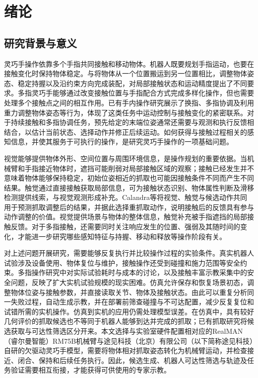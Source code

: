 \chapter{绪论}
\label{chap:ch01_introduction}

\section{研究背景与意义}
\label{sec:research_background}

灵巧手操作依靠多个手指共同接触和移动物体。机器人既要规划手指运动，也要在接触变化时保持物体稳定。与将物体从一个位置搬运到另一位置相比，调整物体姿态、稳定持握以及沿约束方向完成装配，对局部接触状态和运动精度提出了不同要求。多指灵巧手能够通过改变接触位置与手指配合方式完成多样化操作，但也需要处理多个接触点之间的相互作用。已有手内操作研究展示了换指、多指协调及利用重力调整物体姿态等行为，体现了这类任务中运动控制与接触变化的紧密联系\cite{openai2020dexterous}。对于持续接触和多指协调任务，预先给定的末端位姿通常还需要与观测和执行反馈相结合，以估计当前状态、选择动作并修正后续运动。如何获得与接触过程相关的感知信息，并使其服务于可执行的操作，是研究灵巧手操作的一项基础问题。

视觉能够提供物体外形、空间位置与周围环境信息，是操作规划的重要依据。当机械臂和手指接近物体时，遮挡可能削弱对局部接触区域的观察；接触已经发生并不意味着物体能够保持稳定，初始位姿相近的抓取也可能因接触条件不同而产生不同结果。触觉通过直接接触获取局部信息，可为接触状态识别、物体属性判断及滑移检测提供线索，与视觉观测形成补充\cite{luo2017tactile}。Calandra等将视觉、触觉与候选动作共同用于预测抓取调整后的结果，并据此选择重抓取动作，说明接触后的反馈具有参与动作调整的价值\cite{calandra2018feeling}。视觉提供场景与物体的整体信息，触觉补充被手指遮挡的局部接触反馈。对于多指接触，还需要同时关注响应发生的位置、强弱及其随时间的变化，才能进一步研究哪些感知特征与持握、移动和释放等操作阶段有关。

对上述问题开展研究，需要能够反复执行并比较操作过程的实验条件。真实机器人试验涉及设备使用、物体复位与维护，接触操作还受到碰撞和施力范围等安全约束。多指操作研究中对实际试验耗时与成本的讨论，以及接触丰富示教采集中的安全问题，反映了扩大实机试验规模的现实困难\cite{openai2020dexterous,fang2024rh20t}。仿真允许保存和恢复场景初态，调整物体位姿与接触参数，并直接读取关节、物体及接触状态。由此可以重复分析同一失败过程，自动生成示教，并在部署前筛查碰撞与不可达配置，减少反复复位和试错所需的实机操作。仿真到实机的应用仍需处理模型误差\cite{tobin2017randomization}。在仿真中，具有较好几何评价的抓取候选也不等同于机器人能够到达并完成的抓取；已有抓取研究将候选获取与可达性筛选区分开来\cite{bohg2014grasp}。本文选择与实验室硬件配置相对应的RealMAN（睿尔曼智能）RM75B机械臂与途见科技（北京）有限公司（以下简称途见科技）自研的欠驱动灵巧手模型，需要将物体相对抓取姿态转化为机械臂运动，并检查接近、闭合、保持和后续任务执行。因此，候选生成、机器人可达性筛选与轨迹及任务验证需要相互衔接，才能获得可供使用的专家示教。

